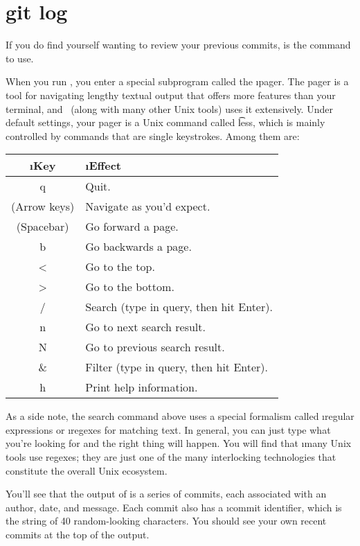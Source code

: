 \documentclass[letterpaper,12pt,titlepage,twoside]{article}
\begin{document}
\section{git log}

If you do find yourself wanting to review your previous commits, 
is the command to use.


When you run , you enter a special subprogram called the \i{pager}.
The pager is a tool for navigating lengthy textual output that offers more
features than your terminal, and \git\ (along with many other Unix tools) uses
it extensively. Under default settings, your pager is a Unix command called
\t{less}, which is mainly controlled by commands that are single keystrokes.
Among them are:

\begin{center}
\begin{tabular}{>{\ttfamily}cl}
\rmfamily\i{Key} & \i{Effect} \\ \hline
q & Quit. \\
\rmfamily(Arrow keys) & Navigate as you'd expect. \\
\rmfamily(Spacebar) & Go forward a page. \\
b & Go backwards a page. \\
< & Go to the top. \\
> & Go to the bottom. \\
/ & Search (type in query, then hit Enter). \\
n & Go to next search result. \\
N & Go to previous search result. \\
\& & Filter (type in query, then hit Enter). \\
h & Print help information.
\end{tabular}
\end{center}

As a side note, the search command above uses a special formalism called
\i{regular expressions} or \i{regexes} for matching text. In general, you can
just type what you're looking for and the right thing will happen. You will
find that \i{many} Unix tools use regexes; they are just one of the many
interlocking technologies that constitute the overall Unix ecosystem.

You'll see that the output of  is a series of commits, each
associated with an author, date, and message. Each commit also has a \i{commit
  identifier}, which is the string of 40 random-looking characters. You should
see your own recent commits at the top of the output.
\end{document}
